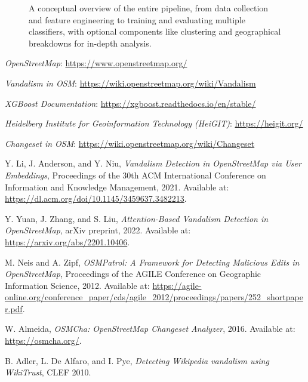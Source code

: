 \documentclass[
    13pt, %
    a4paper, %
    twoside, 
    DIV14, %
    listof=totoc, %
    bibliography=totoc, %
    index=totoc, %
    headsepline
]{scrreprt}
\begin{document}
\begin{figure}[htbp]
    \centering
    \caption{A conceptual overview of the entire pipeline, from data collection and feature engineering to training and evaluating multiple classifiers, with optional components like clustering and geographical breakdowns for in-depth analysis.}
    \label{fig:method_integration_pipeline}
\end{figure}

\begin{thebibliography}{9}

\textit{OpenStreetMap}: \url{https://www.openstreetmap.org/}

\textit{Vandalism in OSM}: \url{https://wiki.openstreetmap.org/wiki/Vandalism}

\textit{XGBoost Documentation}: \url{https://xgboost.readthedocs.io/en/stable/}

\textit{Heidelberg Institute for Geoinformation Technology (HeiGIT)}: \url{https://heigit.org/}

\textit{Changeset in OSM}: \url{https://wiki.openstreetmap.org/wiki/Changeset}

Y. Li, J. Anderson, and Y. Niu, 
\textit{Vandalism Detection in OpenStreetMap via User Embeddings}, 
Proceedings of the 30th ACM International Conference on Information and Knowledge Management, 2021. Available at: \url{https://dl.acm.org/doi/10.1145/3459637.3482213}.

Y. Yuan, J. Zhang, and S. Liu, 
\textit{Attention-Based Vandalism Detection in OpenStreetMap}, 
arXiv preprint, 2022. Available at: \url{https://arxiv.org/abs/2201.10406}.

M. Neis and A. Zipf, 
\textit{OSMPatrol: A Framework for Detecting Malicious Edits in OpenStreetMap}, 
Proceedings of the AGILE Conference on Geographic Information Science, 2012. Available at: \url{https://agile-online.org/conference_paper/cds/agile_2012/proceedings/papers/252_shortpaper.pdf}.

W. Almeida, 
\textit{OSMCha: OpenStreetMap Changeset Analyzer}, 
2016. Available at: \url{https://osmcha.org/}.

B. Adler, L. De Alfaro, and I. Pye, 
\textit{Detecting Wikipedia vandalism using WikiTrust}, 
CLEF 2010.


\end{thebibliography}
\end{document}
